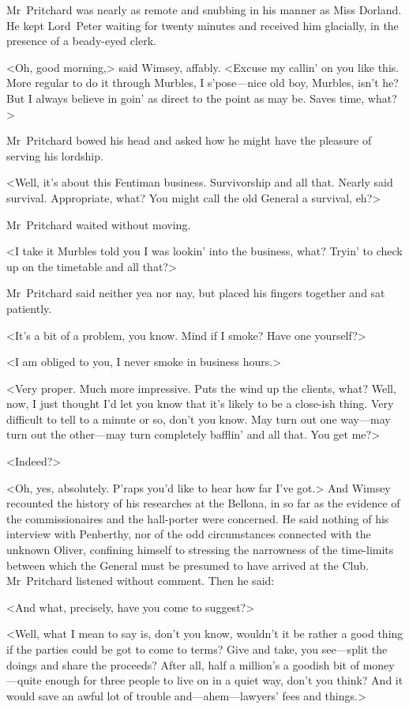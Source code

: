 Mr~Pritchard was nearly as remote and snubbing in his manner as Miss Dorland. He kept Lord~Peter waiting for twenty minutes and received him glacially, in the presence of a beady-eyed clerk.

<Oh, good morning,> said Wimsey, affably. <Excuse my callin' on you like this. More regular to do it through Murbles, I s'pose—nice old boy, Murbles, isn't he? But I always believe in goin' as direct to the point as may be. Saves time, what?>

Mr~Pritchard bowed his head and asked how he might have the pleasure of serving his lordship.

<Well, it's about this Fentiman business. Survivorship and all that. Nearly said survival. Appropriate, what? You might call the old General a survival, eh?>

Mr~Pritchard waited without moving.

<I take it Murbles told you I was lookin' into the business, what? Tryin' to check up on the timetable and all that?>

Mr~Pritchard said neither yea nor nay, but placed his fingers together and sat patiently.

<It's a bit of a problem, you know. Mind if I smoke? Have one yourself?>

<I am obliged to you, I never smoke in business hours.>

<Very proper. Much more impressive. Puts the wind up the clients, what? Well, now, I just thought I'd let you know that it's likely to be a close-ish thing. Very difficult to tell to a minute or so, don't you know. May turn out one way—may turn out the other—may turn completely bafflin' and all that. You get me?>

<Indeed?>

<Oh, yes, absolutely. P'raps you'd like to hear how far I've got.> And Wimsey recounted the history of his researches at the Bellona, in so far as the evidence of the commissionaires and the hall-porter were concerned. He said nothing of his interview with Penberthy, nor of the odd circumstances connected with the unknown Oliver, confining himself to stressing the narrowness of the time-limits between which the General must be presumed to have arrived at the Club. Mr~Pritchard listened without comment. Then he said:

<And what, precisely, have you come to suggest?>

<Well, what I mean to say is, don't you know, wouldn't it be rather a good thing if the parties could be got to come to terms? Give and take, you see—split the doings and share the proceeds? After all, half a million's a goodish bit of money—quite enough for three people to live on in a quiet way, don't you think? And it would save an awful lot of trouble and—ahem—lawyers' fees and things.>

